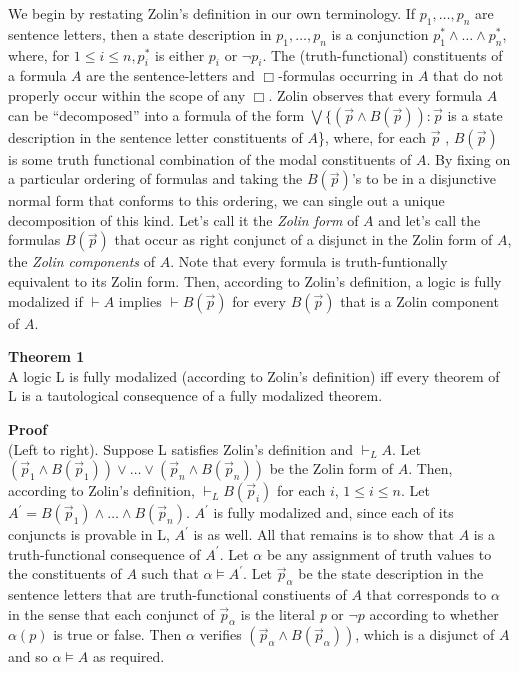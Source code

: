 \documentclass[
  10pt,
  letterpaper,
  DIV=11,
  numbers=noendperiod,
  twoside]{scrartcl}
\begin{document}
We begin by restating Zolin's definition in our own terminology. If
\(p_1,{\ldots},p_n\) are sentence letters, then a state description in
\({p_1,{\ldots},p_n}\) is a conjunction
\(p_1^*\wedge {\ldots}\wedge p_n^*\), where, for \(1\le i\le n, p_i^*\)
is either \(p_i\) or \(\neg p_i\). The (truth-functional) constituents
of a formula \(A\) are the sentence-letters and \(\Box\)-formulas
occurring in \(A\) that do not properly occur within the scope of any
\(\Box\). Zolin observes that every formula \(A\) can be ``decomposed''
into a formula of the form
\({\bigvee}\{(\vec{p}\wedge B(\vec{p}))\!:\vec{p}\) is a state
description in the sentence letter constituents of \(A\)\}, where, for
each \(\vec{p}\) , \(B(\vec{p})\) is some truth functional combination
of the modal constituents of \(A\). By fixing on a particular ordering
of formulas and taking the \(B(\vec{p})\)'s to be in a disjunctive
normal form that conforms to this ordering, we can single out a unique
decomposition of this kind. Let's call it the \emph{Zolin form} of \(A\)
and let's call the formulas \(B(\vec{p})\) that occur as right conjunct
of a disjunct in the Zolin form of \(A\), the \emph{Zolin components} of
\(A\). Note that every formula is truth-funtionally equivalent to its
Zolin form. Then, according to Zolin's definition, a logic is fully
modalized if \(\vdash A\) implies \(\vdash B(\vec{p})\) for every
\(B(\vec{p})\) that is a Zolin component of \(A\).

\textbf{Theorem 1}\\
A logic L is fully modalized (according to Zolin's definition) iff every
theorem of L is a tautological consequence of a fully modalized theorem.

\textbf{Proof}\\
(Left to right). Suppose L satisfies Zolin's definition and
\(\vdash_L A\). Let
\((\vec{p}_1\wedge B(\vec{p}_1))\vee {\ldots}\vee (\vec{p}_n\wedge B(\vec{p}_n))\)
be the Zolin form of \(A\). Then, according to Zolin's definition,
\(\vdash_L B(\vec{p}_i)\) for each \(i\), \(1\le i\le n\). Let
\(A^\prime = B(\vec{p}_1)\wedge {\ldots}\wedge B(\vec{p}_n)\).
\(A^\prime\) is fully modalized and, since each of its conjuncts is
provable in L, \(A^\prime\) is as well. All that remains is to show that
\(A\) is a truth-functional consequence of \(A^\prime\). Let \(\alpha\)
be any assignment of truth values to the constituents of \(A\) such that
\(\alpha\models A^\prime\). Let \(\vec{p}_\alpha\) be the state
description in the sentence letters that are truth-functional
constiuents of \(A\) that corresponds to \(\alpha\) in the sense that
each conjunct of \(\vec{p}_\alpha\) is the literal \emph{p} or
\(\neg p\) according to whether \(\alpha(p)\) is true or false. Then
\(\alpha\) verifies \((\vec{p}_\alpha \wedge B(\vec{p}_\alpha))\), which
is a disjunct of \(A\) and so \(\alpha\models A\) as required.
\end{document}
